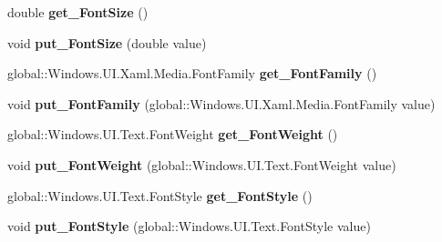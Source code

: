 \begin{DoxyCompactItemize}
double {\bfseries get\+\_\+\+Font\+Size} ()
\item 
\mbox{\label{interface_windows_1_1_u_i_1_1_xaml_1_1_controls_1_1_i_control_a34a055aa84a0508191429e20453c5ce0}} 
void {\bfseries put\+\_\+\+Font\+Size} (double value)
\item 
\mbox{\label{interface_windows_1_1_u_i_1_1_xaml_1_1_controls_1_1_i_control_a689d7b84c03cb8baa86aef968c2f78e5}} 
global\+::\+Windows.\+U\+I.\+Xaml.\+Media.\+Font\+Family {\bfseries get\+\_\+\+Font\+Family} ()
\item 
\mbox{\label{interface_windows_1_1_u_i_1_1_xaml_1_1_controls_1_1_i_control_a9026d2ca28dbe0834360260903186536}} 
void {\bfseries put\+\_\+\+Font\+Family} (global\+::\+Windows.\+U\+I.\+Xaml.\+Media.\+Font\+Family value)
\item 
\mbox{\label{interface_windows_1_1_u_i_1_1_xaml_1_1_controls_1_1_i_control_a72747904d83bab3de0891c213aa46602}} 
global\+::\+Windows.\+U\+I.\+Text.\+Font\+Weight {\bfseries get\+\_\+\+Font\+Weight} ()
\item 
\mbox{\label{interface_windows_1_1_u_i_1_1_xaml_1_1_controls_1_1_i_control_a50f45e373b66a5b092b6464b5dbd94bf}} 
void {\bfseries put\+\_\+\+Font\+Weight} (global\+::\+Windows.\+U\+I.\+Text.\+Font\+Weight value)
\item 
\mbox{\label{interface_windows_1_1_u_i_1_1_xaml_1_1_controls_1_1_i_control_a3e1d85a4f0fe3ee8c4cff3ce4f34a651}} 
global\+::\+Windows.\+U\+I.\+Text.\+Font\+Style {\bfseries get\+\_\+\+Font\+Style} ()
\item 
\mbox{\label{interface_windows_1_1_u_i_1_1_xaml_1_1_controls_1_1_i_control_ae53a72ae88bd4e1f7d417580689134f9}} 
void {\bfseries put\+\_\+\+Font\+Style} (global\+::\+Windows.\+U\+I.\+Text.\+Font\+Style value)
\item 
\mbox{\label{interface_windows_1_1_u_i_1_1_xaml_1_1_controls_1_1_i_control_a228e9d117d9f71834ef119f7e646e5ac}} 

\end{DoxyCompactItemize}
